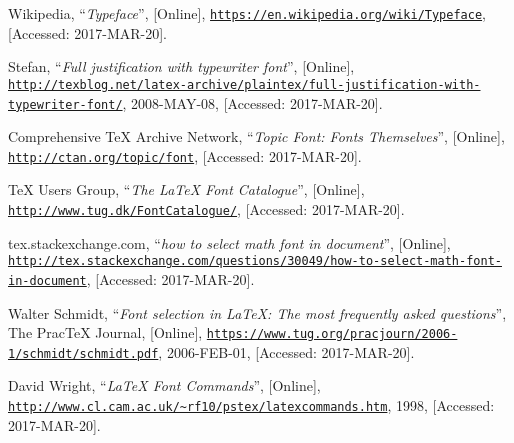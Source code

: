 \documentclass[a4paper,oneside,11pt]{article}
\begin{document}
\begin{thebibliography}{1}
        
        Wikipedia,
        ``\emph{Typeface}'',
        [Online],
        \href{https://en.wikipedia.org/wiki/Typeface}
             {\nolinkurl{https://en.wikipedia.org/wiki/Typeface}},
        [Accessed: 2017-MAR-20].

        Stefan,
        ``\emph{Full justification with typewriter font}'',
        [Online],
        \href{http://texblog.net/latex-archive/plaintex/full-justification-with-typewriter-font/}
             {\nolinkurl{http://texblog.net/latex-archive/plaintex/full-justification-with-typewriter-font/}},
        2008-MAY-08,
        [Accessed: 2017-MAR-20].

        Comprehensive \TeX{} Archive Network,
        ``\emph{Topic Font: Fonts Themselves}'',
        [Online],
        \href{http://ctan.org/topic/font}
             {\nolinkurl{http://ctan.org/topic/font}},
        [Accessed: 2017-MAR-20].

        \TeX{} Users Group,
        ``\emph{The \LaTeX{} Font Catalogue}'',
        [Online],
        \href{http://www.tug.dk/FontCatalogue/}
             {\nolinkurl{http://www.tug.dk/FontCatalogue/}},
        [Accessed: 2017-MAR-20].

        tex.stackexchange.com,
        ``\emph{how to select math font in document}'',
        [Online],
        \href{http://tex.stackexchange.com/questions/30049/how-to-select-math-font-in-document}
             {\nolinkurl{http://tex.stackexchange.com/questions/30049/how-to-select-math-font-in-document}},
        [Accessed: 2017-MAR-20].
        
        Walter Schmidt,
        ``\emph{Font selection in \LaTeX{}: The most frequently asked questions}'',
        The Prac\TeX{} Journal,
        [Online],
        \href{https://www.tug.org/pracjourn/2006-1/schmidt/schmidt.pdf}
             {\nolinkurl{https://www.tug.org/pracjourn/2006-1/schmidt/schmidt.pdf}},
        2006-FEB-01,
        [Accessed: 2017-MAR-20].

        David Wright,
        ``\emph{\LaTeX{} Font Commands}'',
        [Online],
        \href{http://www.cl.cam.ac.uk/~rf10/pstex/latexcommands.htm}
             {\nolinkurl{http://www.cl.cam.ac.uk/~rf10/pstex/latexcommands.htm}},
        1998,
        [Accessed: 2017-MAR-20].


\end{thebibliography}
\end{document}
